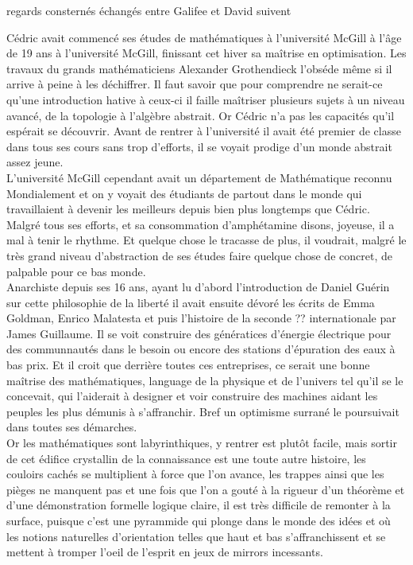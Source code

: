 \documentclass{article}
\begin{document}
regards consternés échangés entre Galifee et David suivent\\

\clearpage

Cédric avait commencé ses études de mathématiques à l'université McGill à l'âge
de 19 ans à l'université McGill, finissant cet hiver sa maîtrise en
optimisation. Les travaux du grands mathématiciens Alexander Grothendieck
l'obséde même si il arrive à peine à les déchiffrer. Il faut savoir
que pour comprendre ne serait-ce qu'une introduction hative à ceux-ci il faille
maîtriser plusieurs sujets à un niveau avancé, de la topologie à l'algèbre
abstrait. Or Cédric n'a pas les capacités qu'il espérait se découvrir. Avant de
rentrer à l'université il avait été premier de classe dans tous ses cours sans
trop d'efforts, il se voyait prodige d'un monde abstrait assez jeune.\\

L'université McGill cependant avait un département de Mathématique reconnu
Mondialement et on y voyait des étudiants de partout dans le monde qui
travaillaient à devenir les meilleurs depuis bien plus longtemps que Cédric.
Malgré tous ses efforts, et sa consommation d'amphétamine disons, joyeuse, il a
mal à tenir le rhythme. Et quelque chose le tracasse de plus, il voudrait,
malgré le très grand niveau d'abstraction de ses études faire quelque chose de
concret, de palpable pour ce bas monde.\\

Anarchiste depuis ses 16 ans, ayant lu d'abord l'introduction de Daniel Guérin
sur cette philosophie de la liberté il avait ensuite dévoré les écrits de Emma
Goldman, Enrico Malatesta et puis l'histoire de la seconde ?? internationale par
James Guillaume. Il se voit construire des génératices d'énergie électrique
pour des communnautés dans le besoin ou encore des stations d'épuration des eaux
à bas prix. Et il croit que derrière toutes ces entreprises, ce serait une
bonne maîtrise des mathématiques, language de la physique et de l'univers tel
qu'il se le concevait, qui l'aiderait à designer et voir construire des machines
aidant les peuples les plus démunis à s'affranchir. Bref un optimisme surrané le
poursuivait dans toutes ses démarches.\\

Or les mathématiques sont labyrinthiques, y rentrer est plutôt facile, mais sortir
de cet édifice crystallin de la connaissance est une toute autre histoire, les couloirs
cachés se multiplient à force que l'on avance, les trappes ainsi que les pièges
ne manquent pas et une fois que l'on a gouté à la rigueur d'un théorème et d'une
démonstration formelle logique claire, il est très difficile de remonter à la
surface, puisque c'est une pyrammide qui plonge dans le monde des idées et où
les notions naturelles d'orientation telles que haut et bas s'affranchissent et
se mettent à tromper l'oeil de l'esprit en jeux de mirrors incessants.\\
\end{document}

